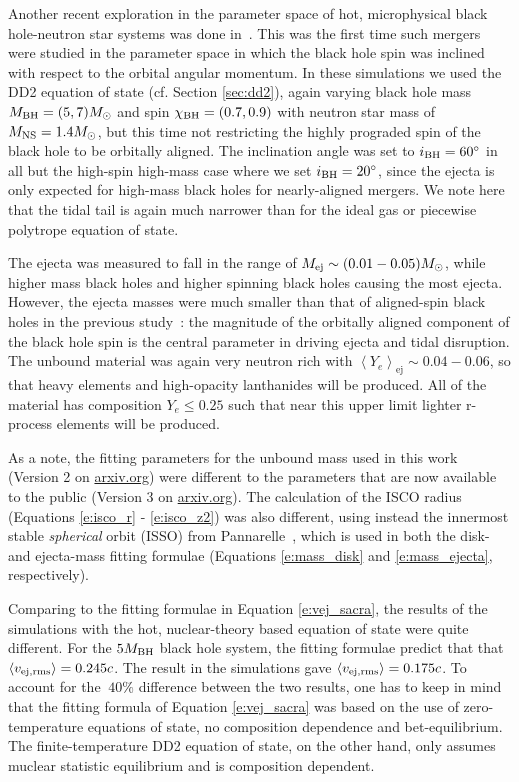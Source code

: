 Another recent exploration in the parameter space of hot, microphysical black hole-neutron star systems was done in~\cite{FoucartDD2:2017}.
This was the first time such mergers were studied in the parameter space in which the black hole spin was inclined with respect to the orbital angular momentum. 
In these simulations we used the DD2 equation of state (cf. Section \ref{sec:dd2}), again varying black hole mass $M_{\rm BH} = (5, 7) M_\odot$ and spin $\chi_{\rm BH} = (0.7, 0.9)$ with neutron star mass of $M_{\rm NS} = 1.4 M_\odot$, but this time not restricting the highly prograded spin of the black hole to be orbitally aligned.
The inclination angle was set to $i_{\rm BH}=60^{\circ}$ in all but the high-spin high-mass case where we set $i_{\rm BH}=20^{\circ}$, since the ejecta is only expected for high-mass black holes for nearly-aligned mergers.
We note here that the tidal tail is again much narrower than for the ideal gas or piecewise polytrope equation of state.  

The ejecta was measured to fall in the range of $M_{\rm ej} \sim (0.01 - 0.05) M_\odot$, while higher mass black holes and higher spinning black holes causing the most ejecta.  
However, the ejecta masses were much smaller than that of aligned-spin black holes in the previous study~\cite{Foucart:2014nda}: the magnitude of the orbitally aligned component of the black hole spin is the central parameter in driving ejecta and tidal disruption.  
The unbound material was again very neutron rich with $\left\langle Y_e \right\rangle_\textrm{ej} \sim 0.04 - 0.06$, so that heavy elements and high-opacity lanthanides will be produced.
All of the material has composition $Y_e \le 0.25$ such that near this upper limit lighter r-process elements will be produced.

As a note, the fitting parameters for the unbound mass used in this work (Version 2 on \url{arxiv.org}) were different to the parameters that are now available to the public (Version 3 on \url{arxiv.org}).
The calculation of the ISCO radius (Equations \ref{e:isco_r} - \ref{e:isco_z2}) was also different, using instead the innermost stable \textit{spherical} orbit (ISSO) from Pannarelle~\cite{Pannarale:2014}, which is used in both the disk- and ejecta-mass fitting formulae (Equations \ref{e:mass_disk} and \ref{e:mass_ejecta}, respectively).

Comparing to the fitting formulae in Equation \ref{e:vej_sacra}, the results of the simulations with the hot, nuclear-theory based equation of state were quite different.  
For the $5 M_{\rm BH}$ black hole system, the fitting formulae predict that that 
$\left\langle v_{\rm ej, rms} \right\rangle = 0.245 c$.
The result in the \SpEC simulations gave $\left\langle v_{\rm ej, rms} \right\rangle = 0.175 c$.
To account for the $~40 \%$ difference between the two results, one has to keep in mind that the fitting formula of  Equation \ref{e:vej_sacra} was based on the use of zero-temperature equations of state, no composition dependence and bet-equilibrium.
The finite-temperature DD2 equation of state, on the other hand, only assumes muclear statistic equilibrium and is composition dependent.  

